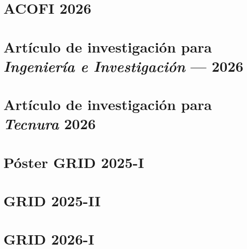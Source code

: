 \appendix


\newpage


\newpage


\newpage


\newpage


\newpage

\FloatBarrier\section{ACOFI 2026}

\newpage

\FloatBarrier\section{Artículo de investigación para \textbf{\textit{Ingeniería e Investigación}} --- 2026}

\newpage


\FloatBarrier\section{Artículo de investigación para \textbf{\textit{Tecnura}} 2026}

\newpage


\FloatBarrier\section{Póster GRID 2025-I}

\newpage

\FloatBarrier\section{GRID 2025-II }

\newpage


\FloatBarrier\section{GRID 2026-I }

\newpage


